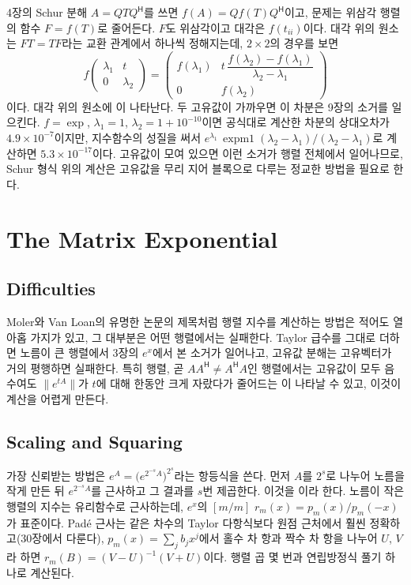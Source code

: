 4장의 Schur 분해 $A=QTQ^{\mathsf H}$를 쓰면 $f(A)=Qf(T)Q^{\mathsf H}$이고, 문제는 위삼각 행렬의 함수 $F=f(T)$로 줄어든다. $F$도 위삼각이고 대각은 $f(t_{ii})$이다. 대각 위의 원소는 $FT=TF$라는 교환 관계에서 하나씩 정해지는데, $2\times2$의 경우를 보면
\[
f\begin{pmatrix}\lambda_1&t\\0&\lambda_2\end{pmatrix}=\begin{pmatrix}f(\lambda_1)&t\,\dfrac{f(\lambda_2)-f(\lambda_1)}{\lambda_2-\lambda_1}\\0&f(\lambda_2)\end{pmatrix}
\]
이다. 대각 위의 원소에 이 나타난다. 두 고유값이 가까우면 이 차분은 9장의 소거를 일으킨다. $f=\exp$, $\lambda_1=1$, $\lambda_2=1+10^{-10}$이면 공식대로 계산한 차분의 상대오차가 $4.9\times10^{-7}$이지만, 지수함수의 성질을 써서 $e^{\lambda_1}\,\operatorname{expm1}(\lambda_2-\lambda_1)/(\lambda_2-\lambda_1)$로 계산하면 $5.3\times10^{-17}$이다. 고유값이 모여 있으면 이런 소거가 행렬 전체에서 일어나므로, Schur 형식 위의 계산은 고유값을 무리 지어 블록으로 다루는 정교한 방법을 필요로 한다.

\section{The Matrix Exponential}
\label{sec:expm}

\subsection{Difficulties}

Moler와 Van Loan의 유명한 논문의 제목처럼 행렬 지수를 계산하는 방법은 적어도 열아홉 가지가 있고, 그 대부분은 어떤 행렬에서는 실패한다\cite{moler2003nineteen}. Taylor 급수를 그대로 더하면 노름이 큰 행렬에서 3장의 $e^x$에서 본 소거가 일어나고, 고유값 분해는 고유벡터가 거의 평행하면 실패한다. 특히  행렬, 곧 $AA^{\mathsf H}\ne A^{\mathsf H}A$인 행렬에서는 고유값이 모두 음수여도 $\|e^{tA}\|$가 $t$에 대해 한동안 크게 자랐다가 줄어드는 이 나타날 수 있고, 이것이 계산을 어렵게 만든다\cite{vanloan1977}.

\subsection{Scaling and Squaring}

가장 신뢰받는 방법은 $e^A=\bigl(e^{2^{-s}A}\bigr)^{2^s}$라는 항등식을 쓴다. 먼저 $A$를 $2^s$로 나누어 노름을 작게 만든 뒤 $e^{2^{-s}A}$를 근사하고 그 결과를 $s$번 제곱한다. 이것을 이라 한다. 노름이 작은 행렬의 지수는 유리함수로 근사하는데, $e^x$의 $[m/m]$  $r_m(x)=p_m(x)/p_m(-x)$가 표준이다. Padé 근사는 같은 차수의 Taylor 다항식보다 원점 근처에서 훨씬 정확하고(30장에서 다룬다), $p_m(x)=\sum_jb_jx^j$에서 홀수 차 항과 짝수 차 항을 나누어 $U$, $V$라 하면 $r_m(B)=(V-U)^{-1}(V+U)$이다. 행렬 곱 몇 번과 연립방정식 풀기 하나로 계산된다.

